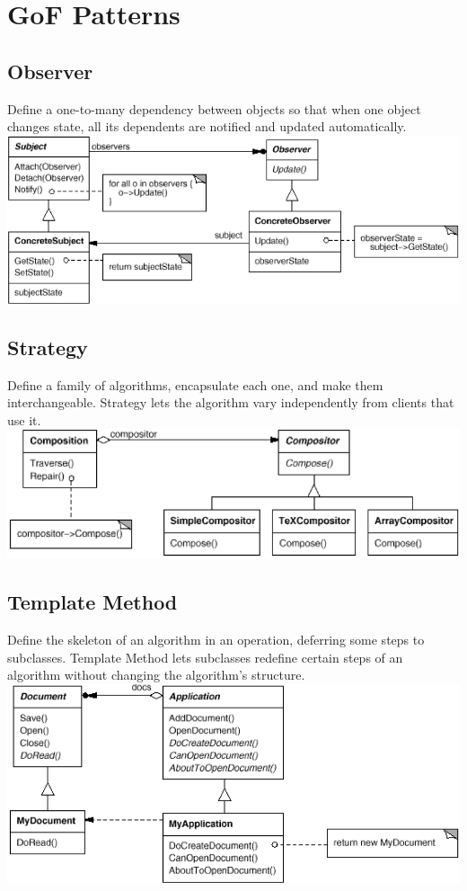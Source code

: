 \section{GoF Patterns}
\subsection{Observer}
Define a one-to-many dependency between objects so that when one object changes state, all its dependents are notified and updated automatically.\\
\includegraphics[width=\linewidth]{./img/observer.png}

\subsection{Strategy}
Define a family of algorithms, encapsulate each one, and make them interchangeable. Strategy lets the algorithm vary independently from clients that use it.\\
\includegraphics[width=\linewidth]{./img/strategy.png}

\subsection{Template Method}
Define the skeleton of an algorithm in an operation, deferring some steps to subclasses. Template Method lets subclasses redefine certain steps of an algorithm without changing the algorithm's structure.\\
\includegraphics[width=\linewidth]{./img/template_method.png}

